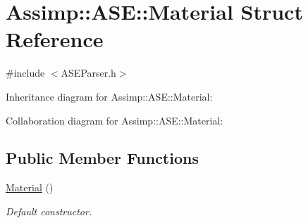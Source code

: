 \hypertarget{struct_assimp_1_1_a_s_e_1_1_material}{\section{Assimp\+:\+:A\+S\+E\+:\+:Material Struct Reference}
\label{struct_assimp_1_1_a_s_e_1_1_material}
}


{\ttfamily \#include $<$A\+S\+E\+Parser.\+h$>$}



Inheritance diagram for Assimp\+:\+:A\+S\+E\+:\+:Material\+:


Collaboration diagram for Assimp\+:\+:A\+S\+E\+:\+:Material\+:
\subsection*{Public Member Functions}
\begin{DoxyCompactItemize}
\item 
\hypertarget{struct_assimp_1_1_a_s_e_1_1_material_a80a2b90abd0da27cacd2bc7eb6e266ec}{\hyperlink{struct_assimp_1_1_a_s_e_1_1_material_a80a2b90abd0da27cacd2bc7eb6e266ec}{Material} ()}\label{struct_assimp_1_1_a_s_e_1_1_material_a80a2b90abd0da27cacd2bc7eb6e266ec}

\begin{DoxyCompactList}\small\item\em Default constructor. \end{DoxyCompactList}\end{DoxyCompactItemize}
